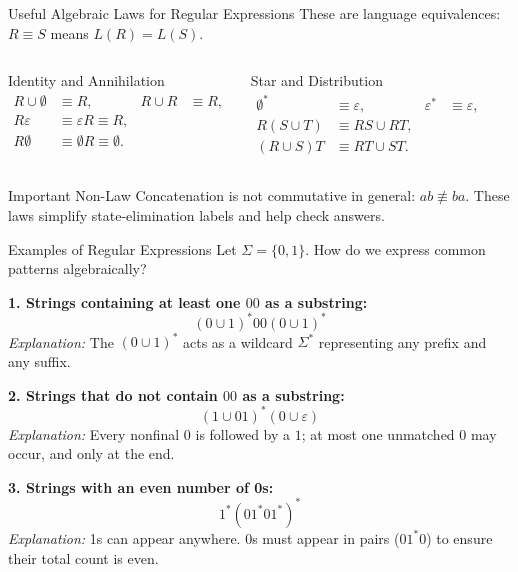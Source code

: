 \documentclass[10pt]{beamer}
\begin{document}
\begin{frame}{Useful Algebraic Laws for Regular Expressions}
  \small
  These are language equivalences: $R\equiv S$ means $L(R)=L(S)$.
  \begin{columns}[T]
    \begin{block}{Identity and Annihilation}
      \[
        \begin{aligned}
          R\cup\emptyset&\equiv R,& R\cup R&\equiv R,\\
          R\varepsilon&\equiv\varepsilon R\equiv R,\\
          R\emptyset&\equiv\emptyset R\equiv\emptyset.
        \end{aligned}
      \]
    \end{block}
    \begin{block}{Star and Distribution}
      \[
        \begin{aligned}
          \emptyset^*&\equiv\varepsilon,& \varepsilon^*&\equiv\varepsilon,\\
          R(S\cup T)&\equiv RS\cup RT,\\
          (R\cup S)T&\equiv RT\cup ST.
        \end{aligned}
      \]
    \end{block}
  \end{columns}
  \begin{alertblock}{Important Non-Law}
    Concatenation is not commutative in general: $ab\not\equiv ba$.
    These laws simplify state-elimination labels and help check answers.
  \end{alertblock}
\end{frame}

\begin{frame}{Examples of Regular Expressions}
  \small
  Let $\Sigma = \{0, 1\}$. How do we express common patterns algebraically?
  \pause

  \vspace{0.3cm}
  \textbf{1. Strings containing at least one $00$ as a substring:}
  \[ (0 \cup 1)^{*} 00 (0 \cup 1)^{*} \]
  \textit{Explanation:} The $(0 \cup 1)^{*}$ acts as a wildcard $\Sigma^*$ representing any prefix and any suffix.
  \pause

  \vspace{0.3cm}
  \textbf{2. Strings that do not contain $00$ as a substring:}
  \[ (1 \cup 01)^{*}(0 \cup \varepsilon) \]
  \textit{Explanation:} Every nonfinal $0$ is followed by a $1$; at most one
  unmatched $0$ may occur, and only at the end.
  \pause

  \vspace{0.3cm}
  \textbf{3. Strings with an even number of 0s:}
  \[ 1^* (01^*01^*)^{*} \]
  \textit{Explanation:} 1s can appear anywhere. 0s must appear in pairs ($01^*0$) to ensure their total count is even.
\end{frame}
\end{document}
